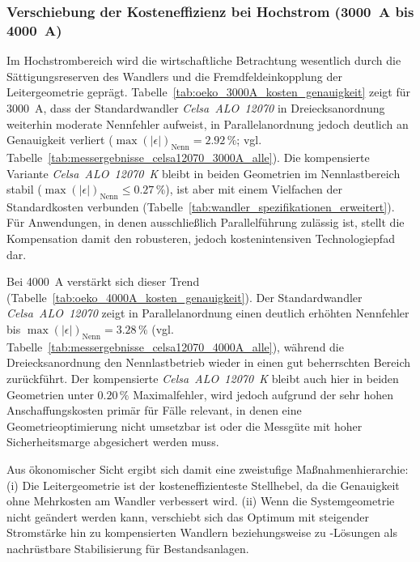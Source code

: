 \subsubsection{Verschiebung der Kosteneffizienz bei Hochstrom (\SI{3000}{A} bis \SI{4000}{A})}

Im Hochstrombereich wird die wirtschaftliche Betrachtung wesentlich durch die Sättigungsreserven des Wandlers und die Fremdfeldeinkopplung der Leitergeometrie geprägt. Tabelle~\ref{tab:oeko_3000A_kosten_genauigkeit} zeigt für \SI{3000}{A}, dass der Standardwandler \textit{Celsa~ALO~12070} in Dreiecksanordnung weiterhin moderate Nennfehler aufweist, in Parallelanordnung jedoch deutlich an Genauigkeit verliert (\(\max(|\epsilon|)_{\mathrm{Nenn}}=\num{2,92}\,\%\); vgl. Tabelle~\ref{tab:messergebnisse_celsa12070_3000A_alle}). Die kompensierte Variante \textit{Celsa~ALO~12070~K} bleibt in beiden Geometrien im Nennlastbereich stabil (\(\max(|\epsilon|)_{\mathrm{Nenn}}\le\num{0,27}\,\%\)), ist aber mit einem Vielfachen der Standardkosten verbunden (Tabelle~\ref{tab:wandler_spezifikationen_erweitert}). Für Anwendungen, in denen ausschließlich Parallelführung zulässig ist, stellt die Kompensation damit den robusteren, jedoch kostenintensiven Technologiepfad dar.

Bei \SI{4000}{A} verstärkt sich dieser Trend (Tabelle~\ref{tab:oeko_4000A_kosten_genauigkeit}). Der Standardwandler \textit{Celsa~ALO~12070} zeigt in Parallelanordnung einen deutlich erhöhten Nennfehler bis \(\max(|\epsilon|)_{\mathrm{Nenn}}=\num{3,28}\,\%\) (vgl. Tabelle~\ref{tab:messergebnisse_celsa12070_4000A_alle}), während die Dreiecksanordnung den Nennlastbetrieb wieder in einen gut beherrschten Bereich zurückführt. Der kompensierte \textit{Celsa~ALO~12070~K} bleibt auch hier in beiden Geometrien unter \(\num{0,20}\,\%\) Maximalfehler, wird jedoch aufgrund der sehr hohen Anschaffungskosten primär für Fälle relevant, in denen eine Geometrieoptimierung nicht umsetzbar ist oder die Messgüte mit hoher Sicherheitsmarge abgesichert werden muss.

Aus ökonomischer Sicht ergibt sich damit eine zweistufige Maßnahmenhierarchie: (i) Die Leitergeometrie ist der kosteneffizienteste Stellhebel, da die Genauigkeit ohne Mehrkosten am Wandler verbessert wird. (ii) Wenn die Systemgeometrie nicht geändert werden kann, verschiebt sich das Optimum mit steigender Stromstärke hin zu kompensierten Wandlern beziehungsweise zu -Lösungen als nachrüstbare Stabilisierung für Bestandsanlagen.

